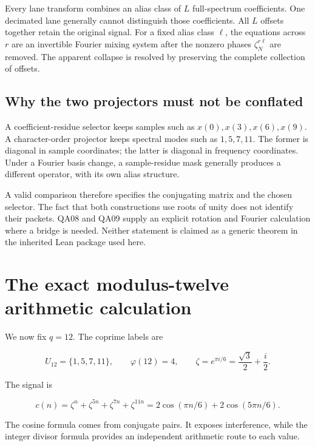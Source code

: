 Every lane transform combines an alias class of \(L\) full-spectrum
coefficients. One decimated lane generally cannot distinguish those
coefficients. All \(L\) offsets together retain the original signal. For
a fixed alias class \(\ell\), the equations across \(r\) are an
invertible Fourier mixing system after the nonzero phases
\(\zeta_N^{r\ell}\) are removed. The apparent collapse is resolved by
preserving the complete collection of offsets.

\hypertarget{why-the-two-projectors-must-not-be-conflated}{%
\subsection{Why the two projectors must not be
conflated}\label{why-the-two-projectors-must-not-be-conflated}}

A coefficient-residue selector keeps samples such as
\(x(0),x(3),x(6),x(9)\). A character-order projector keeps spectral
modes such as \(1,5,7,11\). The former is diagonal in sample
coordinates; the latter is diagonal in frequency coordinates. Under a
Fourier basis change, a sample-residue mask generally produces a
different operator, with its own alias structure.

A valid comparison therefore specifies the conjugating matrix and the
chosen selector. The fact that both constructions use roots of unity
does not identify their packets. QA08 and QA09 supply an explicit
rotation and Fourier calculation where a bridge is needed. Neither
statement is claimed as a generic theorem in the inherited Lean package
used here.

\hypertarget{the-exact-modulus-twelve-arithmetic-calculation}{%
\section{The exact modulus-twelve arithmetic
calculation}\label{the-exact-modulus-twelve-arithmetic-calculation}}

We now fix \(q=12\). The coprime labels are

\[
U_{12}=\{1,5,7,11\},
\qquad \varphi(12)=4,
\qquad \zeta=e^{\pi i/6}=\frac{\sqrt3}{2}+\frac i2.
\]

The signal is

\[
c(n)=\zeta^n+\zeta^{5n}+\zeta^{7n}+\zeta^{11n}
=2\cos(\pi n/6)+2\cos(5\pi n/6).
\]

The cosine formula comes from conjugate pairs. It exposes interference,
while the integer divisor formula provides an independent arithmetic
route to each value.

